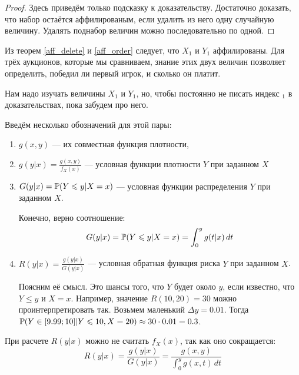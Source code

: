 \begin{proof}
Здесь приведём только подсказку к доказательству. Достаточно доказать, что набор остаётся аффилированым, если удалить из него одну случайную величину. Удалять поднабор величин можно последовательно по одной. \end{proof}


Из теорем \ref{aff_delete} и \ref{aff_order} следует, что $ X_{1} $ и $ Y_{1} $ аффилированы. Для трёх аукционов, которые мы сравниваем, знание этих двух величин позволяет определить, победил ли первый игрок, и сколько он платит.

Нам надо изучать величины $ X_{1} $ и $ Y_{1} $, но, чтобы постоянно не писать индекс $ _{1} $ в доказательствах, пока забудем про него.

Введём несколько обозначений для этой пары:
\begin{enumerate}
\item $ g(x,y) $ — их совместная функция плотности,
\item $ g(y|x)=\frac{g(x,y)}{f_{X}(x)} $ — условная функции плотности $ Y $ при заданном $ X $
\item $ G(y|x)=\P(Y\leq y|X=x)$ — условная функции распределения $ Y $ при заданном $ X $.

Конечно, верно соотношение:
\begin{equation}
G(y|x)=\P(Y\leq y|X=x)=\int_{0}^{y}g(t|x) \, dt
\end{equation}

\item $ R(y|x)=\frac{g(y|x)}{G(y|x)} $ — условная обратная функция риска $ Y $ при заданном $ X $.

Поясним её смысл. Это шансы того, что $ Y $ будет около $ y $, если известно, что $ Y\leq y $ и $ X=x $. Например, значение $ R(10,20)=30 $ можно проинтерпретировать так. Возьмем маленький $ \Delta y=0.01 $. Тогда $ \P(Y\in [9.99;10]|Y\leq 10, X=20)\approx 30\cdot 0.01=0.3 $.
\end{enumerate}

При расчете $ R(y|x) $ можно не считать $ f_{X}(x) $, так как оно сокращается:
\begin{equation}
R(y|x)=\frac{g(y|x)}{G(y|x)}=\frac{g(x,y)}{\int_{0}^{y}g(x,t) \, dt}
\end{equation}

